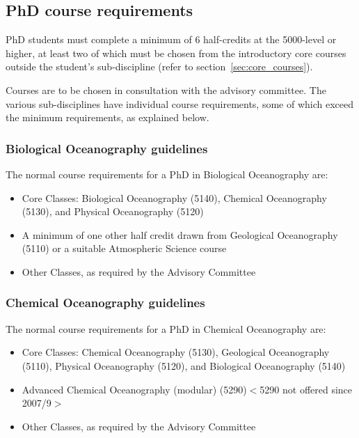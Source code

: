 \documentclass[12pt]{article}
\newcommand{\fixme}[1]{\color{fixmeColor}$<$#1$>$\color{black}\index{$>>>>$FIXME$<<<<$}}
\begin{document}
\subsection{PhD course requirements}

PhD students must complete a minimum of 6 half-credits at the 5000-level or
higher, at least two of which must be chosen from the introductory core courses
outside the student's sub-discipline (refer to section~\ref{sec:core_courses}).


Courses are to be chosen in consultation with the advisory committee. The
various sub-disciplines have individual course requirements, some of which
exceed the minimum requirements, as explained below.

\subsubsection{Biological Oceanography guidelines}

The normal course requirements for a PhD in Biological Oceanography are:
\begin{itemize}
\item Core Classes: Biological Oceanography (5140), Chemical Oceanography (5130), and Physical Oceanography (5120)
\item A minimum of one other half credit drawn from Geological Oceanography (5110) or a suitable Atmospheric Science course
\item Other Classes, as required by the Advisory Committee
\end{itemize}

\subsubsection{Chemical Oceanography guidelines}

The normal course requirements for a PhD in Chemical Oceanography are:

\begin{itemize}
\item Core Classes: Chemical Oceanography (5130), Geological Oceanography (5110), Physical Oceanography (5120), and Biological Oceanography (5140)
\item Advanced Chemical Oceanography (modular) (5290)\fixme{5290 not offered since 2007/9}
\item Other Classes, as required by the Advisory Committee
\end{itemize}
\end{document}
